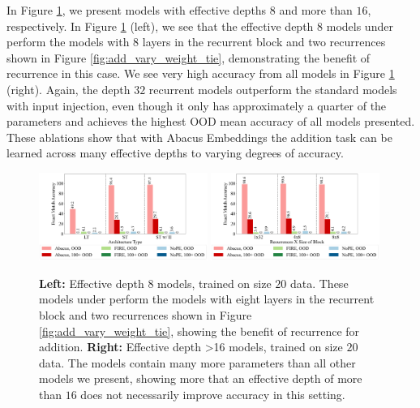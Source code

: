\documentclass{article}
\begin{document}
In Figure \ref{fig:app_vary_depth}, we present models with effective depths \(8\) and  more than \(16\), respectively.
In Figure \ref{fig:app_vary_depth} (left), we see that the effective depth \(8\) models under perform the models with \(8\) layers in the recurrent block and two recurrences shown in Figure \ref{fig:add_vary_weight_tie}, demonstrating the benefit of recurrence in this case.
We see very high accuracy from all models in Figure \ref{fig:app_vary_depth} (right).
Again, the depth $32$ recurrent models outperform the standard models with input injection, even though it only has approximately a quarter of the parameters and achieves the highest OOD mean accuracy of all models presented.
These ablations show that with Abacus Embeddings the addition task can be learned across many effective depths to varying degrees of accuracy.

\begin{figure}[ht!]
    \centering
    \includegraphics[width=0.49\textwidth]{Figures/plot_six_2_bars.pdf}
    \includegraphics[width=0.49\textwidth]{Figures/plot_thirteen_2_bars.pdf}
    \caption{
    \textbf{Left: } Effective depth 8 models, trained on size \(20\) data.
    These models under perform the models with eight layers in the recurrent block and two recurrences shown in Figure \ref{fig:add_vary_weight_tie}, showing the benefit of recurrence for addition.
    \textbf{Right: } Effective depth >16 models, trained on size \(20\) data.
    The models contain many more parameters than all other models we present, showing more that an effective depth of more than $16$ does not necessarily improve accuracy in this setting.
    }
    \label{fig:app_vary_depth}
\end{figure}
\end{document}
